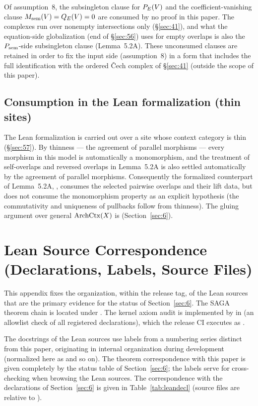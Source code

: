 Of assumption~8, the subsingleton clause for $P_{E}(V)$ and the
coefficient-vanishing clause $M_{\mathrm{sem}}(V)=Q_{E}(V)=0$ are consumed by no
proof in this paper. The complexes run over nonempty intersections
only (\S\ref{sec:41}), and what the equation-side globalization (end
of \S\ref{sec:56}) uses for empty overlaps is also the
$P_{\mathrm{sem}}$-side subsingleton clause (Lemma~5.2A). These unconsumed
clauses are retained in order to fix the input side (assumption~8) in
a form that includes the full identification with the ordered
\v{C}ech complex of \S\ref{sec:41} (outside the scope of this paper).

\subsection{Consumption in the Lean formalization (thin sites)}\label{app:A4}

The Lean formalization is carried out over a site whose context
category is thin (\S\ref{sec:57}). By thinness --- the agreement of
parallel morphisms --- every morphism in this model is automatically a
monomorphism, and the treatment of self-overlaps and reversed overlaps
in Lemma~5.2A is also settled automatically by the agreement of
parallel morphisms. Consequently the formalized counterpart of
Lemma~5.2A, , consumes the
selected pairwise overlaps and their lift data, but does not consume
the monomorphism property as an explicit hypothesis (the commutativity and uniqueness
of pullbacks follow from thinness). The gluing argument over general
$\mathrm{ArchCtx}(X)$ is  (Section~\ref{sec:6}).

\section{Lean Source Correspondence (Declarations, Labels, Source Files)}\label{app:B}

This appendix fixes the organization, within the release tag, of the
Lean sources that are the primary evidence for the status of
Section~\ref{sec:6}. The SAGA theorem chain is located under
. The kernel axiom audit is
implemented by
\allowbreak{}\allowbreak{}
in \allowbreak{} (an allowlist
check of all registered declarations), which the release CI executes as
 \allowbreak{}.

The docstrings of the Lean sources use labels from a numbering series
distinct from this paper, originating in internal organization during
development (normalized here as  and so on). The theorem
correspondence with this paper is given completely by the status table
of Section~\ref{sec:6}; the labels serve for cross-checking when
browsing the Lean sources. The correspondence with the declarations of
Section~\ref{sec:6} is given in Table~\ref{tab:leandecl} (source files
are relative to ).

